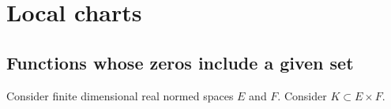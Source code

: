 \chapter{Local charts}%
\label{cha:local-charts}

\section{Functions whose zeros include a given set}

\begin{lemma}%
  \label{lem:chart-one-deriv-zero-bdd}
  Consider finite dimensional real normed spaces \(E\) and \(F\).
  Consider \(K \subset E \times F\).
\end{lemma}


